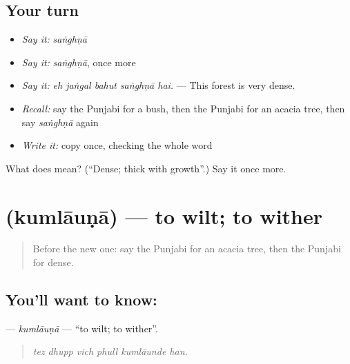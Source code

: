 \subsection*{Your turn}
\begin{itemize}
\raggedright
  \item \emph{Say it:} \emph{saṅghṇā}
  \item \emph{Say it:} \emph{saṅghṇā}, once more
  \item \emph{Say it:} \emph{eh jaṅgal bahut saṅghṇā hai.} — This forest is very dense.
  \item \emph{Recall:} say the Punjabi for a bush, then the Punjabi for an acacia tree, then say \emph{saṅghṇā} again
  \item \emph{Write it:} copy \textbf{} once, checking the whole word
\end{itemize}

\begin{tcolorbox}[breakable,colback=teal!4,colframe=teal!35!black,title={Before you move on}]
What does  mean? (\textquotedblleft{}Dense; thick with growth\textquotedblright{}.) Say it once more.
\end{tcolorbox}
\section[\texorpdfstring{\pa{ਕੁਮਲਾਉਣਾ} (kumlāuṇā)}{ਕੁਮਲਾਉਣਾ (kumlāuṇā)}]{ (kumlāuṇā) — to wilt; to wither}

\label{lesson:PA-C298-kumlauna}



\begin{quote}
Before the new one: say the Punjabi for an acacia tree, then the Punjabi for dense.
\end{quote}

\subsection*{You'll want to know: }
\textbf{} — \emph{kumlāuṇā} — \textquotedblleft{}to wilt; to wither\textquotedblright{}.

\begin{quote}
     
\end{quote}

\begin{quote}
\emph{tez dhupp vich phull kumlāunde han.}
\end{quote}

